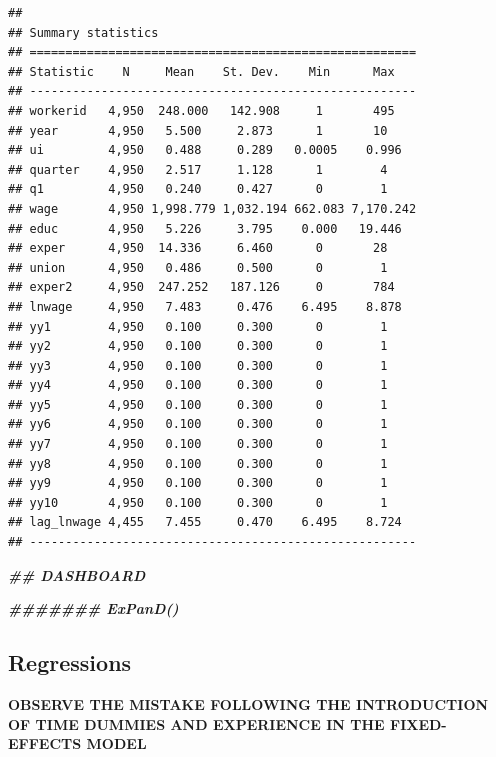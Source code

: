 \documentclass[
]{article}
\newenvironment{Shaded}{\begin{snugshade}}{\end{snugshade}}
\newcommand{\DocumentationTok}[1]{\textcolor[rgb]{0.56,0.35,0.01}{\textbf{\textit{#1}}}}
\begin{document}
\begin{verbatim}
## 
## Summary statistics
## ======================================================
## Statistic    N     Mean    St. Dev.    Min      Max   
## ------------------------------------------------------
## workerid   4,950  248.000   142.908     1       495   
## year       4,950   5.500     2.873      1       10    
## ui         4,950   0.488     0.289   0.0005    0.996  
## quarter    4,950   2.517     1.128      1        4    
## q1         4,950   0.240     0.427      0        1    
## wage       4,950 1,998.779 1,032.194 662.083 7,170.242
## educ       4,950   5.226     3.795    0.000   19.446  
## exper      4,950  14.336     6.460      0       28    
## union      4,950   0.486     0.500      0        1    
## exper2     4,950  247.252   187.126     0       784   
## lnwage     4,950   7.483     0.476    6.495    8.878  
## yy1        4,950   0.100     0.300      0        1    
## yy2        4,950   0.100     0.300      0        1    
## yy3        4,950   0.100     0.300      0        1    
## yy4        4,950   0.100     0.300      0        1    
## yy5        4,950   0.100     0.300      0        1    
## yy6        4,950   0.100     0.300      0        1    
## yy7        4,950   0.100     0.300      0        1    
## yy8        4,950   0.100     0.300      0        1    
## yy9        4,950   0.100     0.300      0        1    
## yy10       4,950   0.100     0.300      0        1    
## lag_lnwage 4,455   7.455     0.470    6.495    8.724  
## ------------------------------------------------------
\end{verbatim}

\begin{Shaded}
\begin{Highlighting}[]
\DocumentationTok{\#\# DASHBOARD}

  \DocumentationTok{\#\#\#\#\#\#\# ExPanD()}
\end{Highlighting}
\end{Shaded}

\hypertarget{regressions}{%
\subsection{Regressions}\label{regressions}}

\textbf{OBSERVE THE MISTAKE FOLLOWING THE INTRODUCTION OF TIME DUMMIES
AND EXPERIENCE IN THE FIXED-EFFECTS MODEL}
\end{document}

